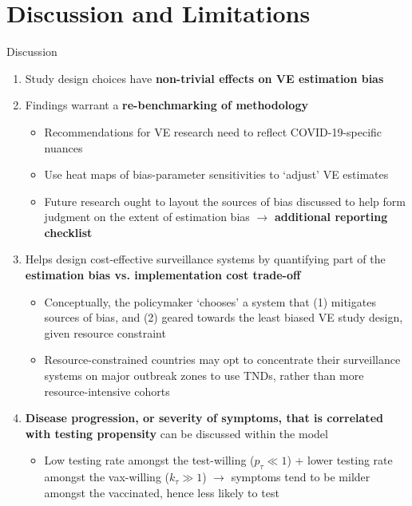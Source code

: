 \documentclass[aspectratio=169]{beamer}
\begin{document}
\section{Discussion and Limitations}
\begin{frame}{Discussion}
	\small
	\begin{enumerate}
		\item Study design choices have \textbf{non-trivial effects on VE estimation bias}
		\item Findings warrant a \textbf{re-benchmarking of methodology}
		\begin{itemize}
			\scriptsize
			\item Recommendations for VE research need to reflect COVID-19-specific nuances
			\item Use heat maps of bias-parameter sensitivities to `adjust' VE estimates
			\item Future research ought to layout the sources of bias discussed to help form judgment on the extent of estimation bias $\rightarrow$ \textbf{additional reporting checklist}
		\end{itemize}
		\item Helps design cost-effective surveillance systems by quantifying part of the \textbf{estimation bias vs. implementation cost trade-off}
		\begin{itemize}
			\scriptsize
			\item Conceptually, the policymaker `chooses' a system that (1) mitigates sources of bias, and (2) geared towards the least biased VE study design, given resource constraint
			\item Resource-constrained countries may opt to concentrate their surveillance systems on major outbreak zones to use TNDs, rather than more resource-intensive cohorts
		\end{itemize}
		\item \textbf{Disease progression, or severity of symptoms, that is correlated with testing propensity} can be discussed within the model
		\begin{itemize}
			\scriptsize
			\item Low testing rate amongst the test-willing ($p_\tau \ll 1$) + lower testing rate amongst the vax-willing ($k_\tau \gg 1$) $\rightarrow$ symptoms tend to be milder amongst the vaccinated, hence less likely to test
		\end{itemize}
	\end{enumerate}
\end{frame}
\end{document}
